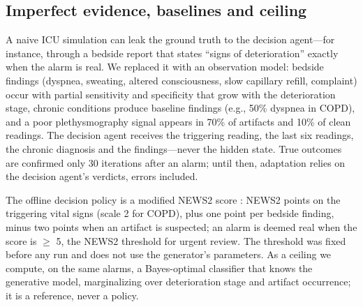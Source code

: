 \documentclass{ieeeaccess}
\begin{document}
\subsection{Imperfect evidence, baselines and ceiling}\label{sec:3.4}
A naive ICU simulation can leak the ground truth to the decision agent—for instance, through a bedside report that states ``signs of deterioration'' exactly when the alarm is real. We replaced it with an observation model: bedside findings (dyspnea, sweating, altered consciousness, slow capillary refill, complaint) occur with partial sensitivity and specificity that grow with the deterioration stage, chronic conditions produce baseline findings (e.g., 50\% dyspnea in COPD), and a poor plethysmography signal appears in 70\% of artifacts and 10\% of clean readings. The decision agent receives the triggering reading, the last six readings, the chronic diagnosis and the findings—never the hidden state. True outcomes are confirmed only 30 iterations after an alarm; until then, adaptation relies on the decision agent's verdicts, errors included.

The offline decision policy is a modified NEWS2 score \cite{rcp2017news2}: NEWS2 points on the triggering vital signs (scale 2 for COPD), plus one point per bedside finding, minus two points when an artifact is suspected; an alarm is deemed real when the score is $\geq$ 5, the NEWS2 threshold for urgent review. The threshold was fixed before any run and does not use the generator's parameters. As a ceiling we compute, on the same alarms, a Bayes-optimal classifier that knows the generative model, marginalizing over deterioration stage and artifact occurrence; it is a reference, never a policy.
\end{document}
